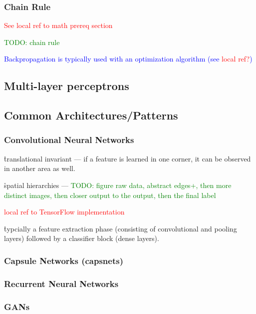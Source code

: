 \subsubsection{Chain Rule}

\textcolor{red}{See \textcolor{red}{local ref to math prereq section}}

\textcolor{green}{TODO: chain rule}

\textcolor{blue}{Backpropagation is typically used with an optimization algorithm (see \textcolor{red}{local ref?})}

\subsection{Multi-layer perceptrons}

\subsection{Common Architectures/Patterns}

\subsubsection{Convolutional Neural Networks}

\r{translational invariant --- if a feature is learned in one corner, it can be observed in another area as well.}

\r{spatial hierarchies --- \textcolor{green}{TODO: figure raw data, abstract edges+, then more distinct images, then closer output to the output, then the final label}}

\textcolor{red}{local ref to TensorFlow implementation}

\r{typcially a feature extraction phase (consisting of convolutional and pooling layers) followed by a classifier block (dense layers).}

\subsubsection{Capsule Networks (capsnets)}

\subsubsection{Recurrent Neural Networks}

\subsubsection{GANs}

